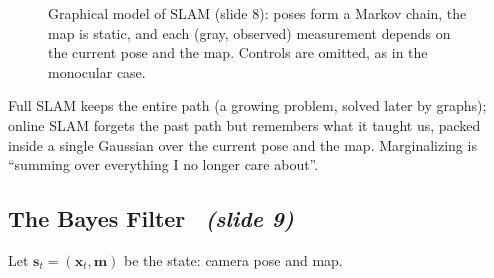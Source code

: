 \documentclass[11pt,a4paper]{article}
\newcommand{\slrs}[1]{\texorpdfstring{\ \emph{(slide #1)}}{ (slide #1)}}
\newcommand{\bx}{\mathbf{x}}
\newcommand{\bz}{\mathbf{z}}
\newcommand{\bs}{\mathbf{s}}
\newcommand{\bm}{\mathbf{m}}
\begin{document}
\begin{figure}[htbp]\centering
{}
\caption{Graphical model of SLAM (slide 8): poses form a Markov chain, the map is static, and each (gray, observed) measurement depends on the current pose and the map. Controls are omitted, as in the monocular case.}
\end{figure}
\begin{intuition}
Full SLAM keeps the entire path (a growing problem, solved later by graphs); online SLAM forgets the past path but remembers what it taught us, packed inside a single Gaussian over the current pose and the map. Marginalizing is ``summing over everything I no longer care about''.
\end{intuition}

\subsection{The Bayes Filter \slrs{9}}
Let $\bs_t=(\bx_t,\bm)$ be the state: camera pose and map.
\end{document}

